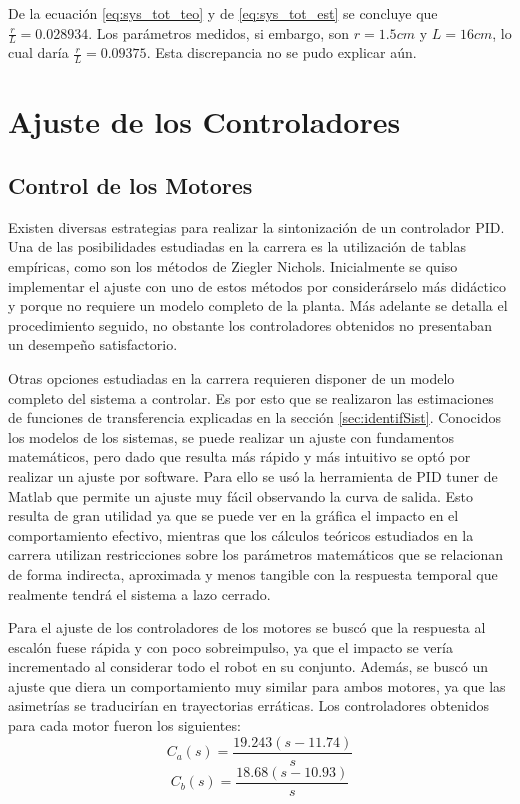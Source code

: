 \documentclass[10pt,conference,a4paper,onecolumn]{article}%
\begin{document}
De la ecuación \ref{eq:sys_tot_teo} y de \ref{eq:sys_tot_est}  se concluye que $\frac{r}{L}=0.028934 $. Los parámetros medidos, si embargo, son $r=1.5cm$ y $L=16cm$, lo cual daría $\frac{r}{L}=0.09375 $. Esta discrepancia no se pudo explicar aún.   

\section{Ajuste de los Controladores} 
\label{sec:ajus_control}
\subsection{Control de los Motores}
Existen diversas estrategias para realizar la sintonización de un controlador PID. Una de las posibilidades estudiadas en la carrera es la utilización de tablas empíricas, como son los métodos de Ziegler Nichols. Inicialmente se quiso implementar el ajuste con uno de estos métodos por considerárselo más didáctico y porque no requiere un modelo completo de la planta. Más adelante se detalla el procedimiento seguido, no obstante los controladores obtenidos no presentaban un desempeño satisfactorio.

Otras opciones estudiadas en la carrera requieren disponer de un modelo completo del sistema a controlar. Es por esto que se realizaron las estimaciones de funciones de transferencia explicadas en la sección \ref{sec:identifSist}. Conocidos los modelos de los sistemas, se puede realizar un ajuste con fundamentos matemáticos, pero dado que resulta más rápido y más intuitivo se optó por realizar un ajuste por software. Para ello se usó la herramienta de PID tuner de Matlab \cite{PID_tuner} que permite un ajuste muy fácil observando la curva de salida. Esto resulta de gran utilidad ya que se puede ver en la gráfica el impacto en el comportamiento efectivo, mientras que los cálculos teóricos estudiados en la carrera utilizan restricciones sobre los parámetros matemáticos que se relacionan de forma indirecta, aproximada y menos tangible con la respuesta temporal que realmente tendrá el sistema a lazo cerrado.

Para el ajuste de los controladores de los motores se buscó que la respuesta al escalón fuese rápida y con poco sobreimpulso, ya que el impacto se vería incrementado al considerar todo el robot en su conjunto. Además, se buscó un ajuste que diera un comportamiento muy similar para ambos motores, ya que las asimetrías se traducirían en trayectorias erráticas. Los controladores obtenidos para cada motor fueron los siguientes:
\begin{equation*}
C_a(s)= \frac{  19.243 (s-11.74)}{s}
\end{equation*}
\begin{equation*}
C_b(s)= \frac{ 18.68 (s-10.93)}{s}
\end{equation*}
\end{document}
